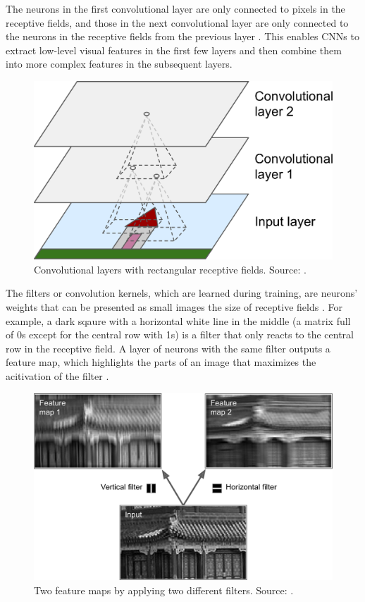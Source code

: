 \documentclass[a4paper, 11pt, oneside]{article}
\begin{document}
  The neurons in the first convolutional layer are only connected to pixels in the receptive fields, and those in
  the next convolutional layer are only connected to the neurons in the receptive fields from the previous layer
  \cite{geron2019hands}. This enables CNNs to extract low-level visual features in the first few layers and then combine
  them into more complex features in the subsequent layers.

  \begin{figure}[ht]
    \begin{center}
      \includegraphics[width=.5\textwidth]{cnn_layers.png}
    \end{center}
    \caption{Convolutional layers with rectangular receptive fields. Source: \cite{geron2019hands}.}
  \end{figure}

  The filters or convolution kernels, which are learned during training, are neurons' weights that can be presented as
  small images the size of receptive fields \cite{geron2019hands}. For example, a dark sqaure with a horizontal white
  line in the middle (a matrix full of 0s except for the central row with 1s) is a filter that only reacts to the central
  row in the receptive field. A layer of neurons with the same filter outputs a feature map, which highlights the parts
  of an image that maximizes the acitivation of the filter \cite{geron2019hands}.

  \begin{figure}[ht]
    \begin{center}
      \includegraphics[width=.6\textwidth]{filters.png}
    \end{center}
    \caption{Two feature maps by applying two different filters. Source: \cite{geron2019hands}.}
  \end{figure}
\end{document}
